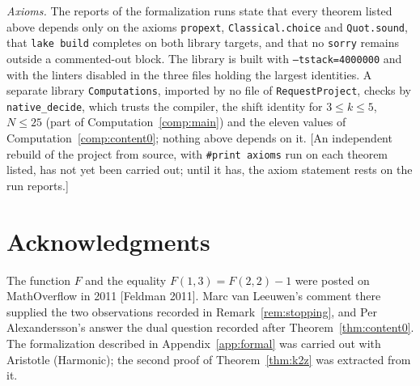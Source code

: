 \documentclass[11pt]{article}
\theoremstyle{definition}
\theoremstyle{remark}
\begin{document}
\emph{Axioms.} The reports of the formalization runs state that every theorem listed above depends only on the axioms \texttt{propext}, \texttt{Classical.choice} and \texttt{Quot.sound}, that \texttt{lake build} completes on both library targets, and that no \texttt{sorry} remains outside a commented-out block. The library is built with \texttt{--tstack=4000000} and with the linters disabled in the three files holding the largest identities. A separate library \texttt{Computations}, imported by no file of \texttt{RequestProject}, checks by \texttt{native\_decide}, which trusts the compiler, the shift identity for $3\le k\le5$, $N\le25$ (part of Computation~\ref{comp:main}) and the eleven values of Computation~\ref{comp:content0}; nothing above depends on it. [An independent rebuild of the project from source, with \texttt{\#print axioms} run on each theorem listed, has not yet been carried out; until it has, the axiom statement rests on the run reports.]

\section*{Acknowledgments}
The function $F$ and the equality $F(1,3)=F(2,2)-1$ were posted on MathOverflow in 2011 [Feldman 2011]. Marc van Leeuwen's comment there supplied the two observations recorded in Remark~\ref{rem:stopping}, and Per Alexandersson's answer the dual question recorded after Theorem~\ref{thm:content0}. The formalization described in Appendix~\ref{app:formal} was carried out with Aristotle (Harmonic); the second proof of Theorem~\ref{thm:k2z} was extracted from it.
\end{document}
